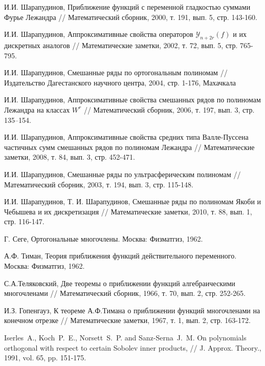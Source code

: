 \begin{thebibliography}{1}
 И.И. Шарапудинов, Приближение функций с переменной гладкостью суммами Фурье Лежандра // Математический сборник, 2000, т. 191, вып. 5, стр. 143-160.


 И.И. Шарапудинов, Аппроксимативные свойства операторов $\mathcal{Y}_{n+2r}(f)$ и их дискретных аналогов // Математические заметки, 2002, т. 72, вып. 5, стр. 765-795.

 И.И. Шарапудинов, Смешанные ряды по ортогональным полиномам // Издательство Дагестанского научного центра, 2004, стр. 1-176, Махачкала




 И.И. Шарапудинов, Аппроксимативные свойства смешанных рядов по полиномам Лежандра на классах $W^r$ // Математический сборник, 2006, т. 197, вып. 3, стр. 135–154.


 И.И. Шарапудинов, Аппроксимативные свойства средних типа Валле-Пуссена частичных сумм смешанных рядов по полиномам Лежандра // Математические заметки, 2008, т. 84, вып. 3, стр. 452-471.

 И.И. Шарапудинов, Смешанные ряды по ультрасферическим полиномам // Математический сборник, 2003, т. 194, вып. 3, стр. 115-148.




 И.И. Шарапудинов, Т. И. Шарапудинов, Смешанные ряды по полиномам Якоби и Чебышева и их дискретизация // Математические заметки, 2010, т. 88, вып. 1, стр. 116-147.





 Г. Сеге, Ортогональные многочлены. Москва: Физматгиз, 1962.

 А.Ф. Тиман, Теория приближения функций действительного переменного. Москва: Физматгиз, 1962.

 С.А.Теляковский, Две теоремы о приближении функций
алгебраическими многочленами // Математический сборник, 1966, т. 70, вып. 2, стр. 252-265.

 И.З. Гопенгауз, К теореме А.Ф.Тимана о приближении
функций многочленами на конечном отрезке // Математические заметки, 1967, т. 1, вып. 2, стр. 163-172.

 Iserles~A., Koch~P.~E., Norsett~S.~P. and Sanz-Serna~J.~M. On polynomials orthogonal with respect to certain Sobolev inner products, // J. Approx. Theory., 1991, vol. 65, pp. 151-175.


\end{thebibliography}
